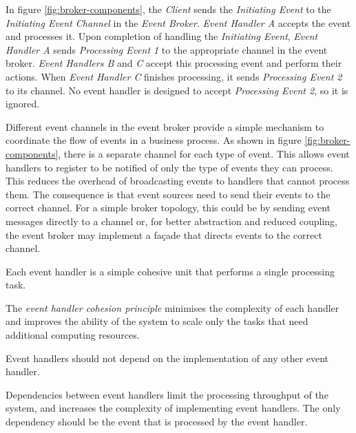 In figure \ref{fig:broker-components}, the \emph{Client} sends the \emph{Initiating Event} to the \emph{Initiating Event Channel} in the \emph{Event Broker}.
\emph{Event Handler A} accepts the event and processes it.
Upon completion of handling the \emph{Initiating Event},
\emph{Event Handler A} sends \emph{Processing Event 1} to the appropriate channel in the event broker.
\emph{Event Handlers B} and \emph{C} accept this processing event and perform their actions.
When \emph{Event Handler C} finishes processing, it sends \emph{Processing Event 2} to its channel.
No event handler is designed to accept \emph{Processing Event 2}, so it is ignored.

Different event channels in the event broker provide a simple mechanism to coordinate the flow of events in a business process.
As shown in figure \ref{fig:broker-components}, there is a separate channel for each type of event.
This allows event handlers to register to be notified of only the type of events they can process.
This reduces the overhead of broadcasting events to handlers that cannot process them.
The consequence is that event sources need to send their events to the correct channel.
For a simple broker topology, this could be by sending event messages directly to a channel
or, for better abstraction and reduced coupling, the event broker may implement a façade that directs events to the correct channel.

\vspace{1mm}
\begin{definition}\label{def:cohesion}
    Each event handler is a simple cohesive unit that performs a single processing task.
\end{definition}

The \emph{event handler cohesion principle} minimises the complexity of each handler and
improves the ability of the system to scale only the tasks that need additional computing resources.

\vspace{1mm}
\begin{definition}\label{def:independence}
    Event handlers should not depend on the implementation of any other event handler.
\end{definition}

Dependencies between event handlers limit the processing throughput of the system,
and increases the complexity of implementing event handlers.
The only dependency should be the event that is processed by the event handler.

